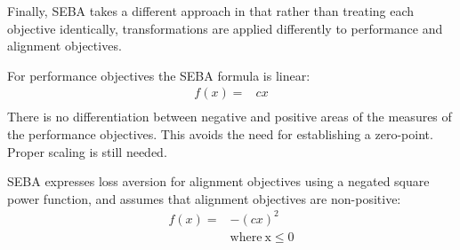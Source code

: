 Finally, SEBA takes a different approach in that rather than treating each objective identically, transformations are applied differently to performance and alignment objectives.%

For performance objectives the SEBA formula is linear:
\begin{align}
f(x)= &  cx \\ \nonumber
\end{align}
There is no differentiation between negative and positive areas of the measures of the performance objectives. This avoids the need for establishing a zero-point. Proper scaling is still needed.

SEBA expresses loss aversion for alignment objectives using a negated square power function, and assumes that alignment objectives are non-positive:
\begin{align}
\label{eq:seba}
f(x)= &  -(cx)^2 \\ \nonumber
  &  \mathrm{ where \: x \leq 0}
\end{align}

